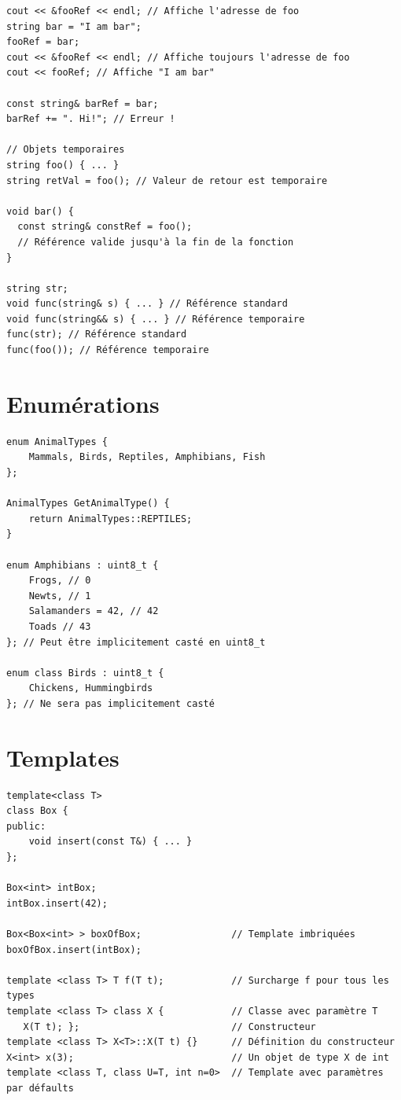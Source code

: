 \documentclass{article}
\begin{document}
\begin{multicols*}{3}
\begin{lstlisting}
cout << &fooRef << endl; // Affiche l'adresse de foo
string bar = "I am bar";
fooRef = bar;
cout << &fooRef << endl; // Affiche toujours l'adresse de foo
cout << fooRef; // Affiche "I am bar"

const string& barRef = bar;
barRef += ". Hi!"; // Erreur !

// Objets temporaires
string foo() { ... }
string retVal = foo(); // Valeur de retour est temporaire

void bar() {
  const string& constRef = foo();
  // Référence valide jusqu'à la fin de la fonction
}

string str;
void func(string& s) { ... } // Référence standard
void func(string&& s) { ... } // Référence temporaire
func(str); // Référence standard
func(foo()); // Référence temporaire

\end{lstlisting}

    \section*{Enumérations}

    \begin{lstlisting}
enum AnimalTypes {
    Mammals, Birds, Reptiles, Amphibians, Fish
};

AnimalTypes GetAnimalType() {
    return AnimalTypes::REPTILES;
}

enum Amphibians : uint8_t {
    Frogs, // 0
    Newts, // 1
    Salamanders = 42, // 42
    Toads // 43
}; // Peut être implicitement casté en uint8_t

enum class Birds : uint8_t {
    Chickens, Hummingbirds
}; // Ne sera pas implicitement casté
\end{lstlisting}

    \section*{Templates}

    \begin{lstlisting}
template<class T>
class Box {
public:
    void insert(const T&) { ... }
};

Box<int> intBox;
intBox.insert(42);

Box<Box<int> > boxOfBox;                // Template imbriquées
boxOfBox.insert(intBox);

template <class T> T f(T t);            // Surcharge f pour tous les types
template <class T> class X {            // Classe avec paramètre T
   X(T t); };                           // Constructeur
template <class T> X<T>::X(T t) {}      // Définition du constructeur
X<int> x(3);                            // Un objet de type X de int
template <class T, class U=T, int n=0>  // Template avec paramètres par défaults


\end{lstlisting}
\end{multicols*}
\end{document}
